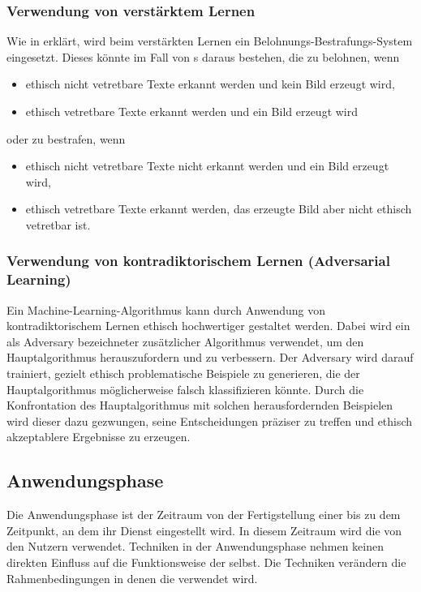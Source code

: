 \documentclass[12pt]{report}
\begin{document}
\subsubsection{Verwendung von verstärktem Lernen}
Wie in  erklärt, wird beim verstärkten Lernen ein Belohnungs-Bestrafungs-System eingesetzt. Dieses könnte im Fall von s daraus bestehen, die  zu belohnen, wenn 
\begin{itemize}
    \item ethisch nicht vetretbare Texte erkannt werden und kein Bild erzeugt wird,
    \item ethisch vetretbare Texte erkannt werden und ein Bild erzeugt wird
\end{itemize}
oder zu bestrafen, wenn
\begin{itemize}
    \item ethisch nicht vetretbare Texte nicht erkannt werden und ein Bild erzeugt wird,
    \item ethisch vetretbare Texte erkannt werden, das erzeugte Bild aber nicht ethisch vetretbar ist.
\end{itemize}  

\subsubsection{Verwendung von kontradiktorischem Lernen (Adversarial Learning)}
Ein Machine-Learning-Algorithmus kann durch Anwendung von kontradiktorischem Lernen ethisch hochwertiger gestaltet werden. Dabei wird ein als Adversary bezeichneter zusätzlicher Algorithmus verwendet, um den Hauptalgorithmus herauszufordern und zu verbessern. \cite[S. 3]{Kurakin} Der Adversary wird darauf trainiert, gezielt ethisch problematische Beispiele zu generieren, die der Hauptalgorithmus möglicherweise falsch klassifizieren könnte. Durch die Konfrontation des Hauptalgorithmus mit solchen herausfordernden Beispielen wird dieser dazu gezwungen, seine Entscheidungen präziser zu treffen und ethisch akzeptablere Ergebnisse zu erzeugen.

\subsection{Anwendungsphase}

Die Anwendungsphase ist der Zeitraum von der Fertigstellung einer  bis zu dem Zeitpunkt, an dem ihr Dienst eingestellt wird. In diesem Zeitraum wird die  von den Nutzern verwendet. Techniken in der Anwendungsphase nehmen keinen direkten Einfluss auf die Funktionsweise der  selbst. Die Techniken verändern die Rahmenbedingungen in denen die  verwendet wird.
\end{document}
